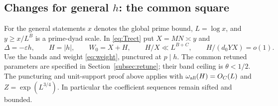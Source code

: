 \documentclass[11pt]{article}
\theoremstyle{definition}
\theoremstyle{remark}
\numberwithin{equation}{section}
\begin{document}
\subsection{Changes for general \texorpdfstring{$h$}{h}: the common square}\label{subsec:affine-setting}
For the general statements $x$ denotes the global prime bound,
$L=\log x$, and $y\ge x/L^B$ is a prime-dyad scale.
In \eqref{eq:Trect} put $X=MN\asymp y$ and
\begin{equation}\label{v2:2-1}
 \Delta=-\varepsilon h,\qquad H=|h|,\qquad W_0=X+H,
 \qquad H/X\ll L^{B+C},\qquad H/(d_0YX)=o(1).
\end{equation}
Use the bands and weight \eqref{eq:weight}, punctured at $p\mid h$.
The common retuned parameters are specified in
Section~\ref{subsec:retune}; their band ceiling is $\theta<1/2$.
The puncturing and unit-support proof above applies with
$\omega_{\rm all}(H)=O_C(L)$ and $Z=\exp(L^{3/4})$.
In particular the coefficient sequences remain sifted and bounded.
\end{document}
